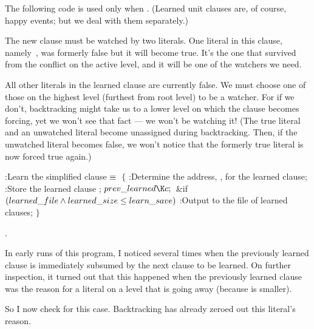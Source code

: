 The following code is used only when .
(Learned
unit clauses are, of course, happy events; but we deal with them separately.)

The new clause must be watched by two literals. One literal in this
clause, namely~, was formerly false but it will become true.
It's the one that survived from the conflict
on the active level, and it will be one of the watchers we need.

All other literals in the learned clause are currently false. We must
choose one of those on the highest level (furthest from root level)
to be a watcher. For if we don't, backtracking might take us to
a lower level on which the clause becomes forcing, yet we won't
see that fact --- we won't be watching it! (The true literal and
an unwatched literal become unassigned during backtracking.
Then, if the unwatched literal
becomes false, we won't notice that the formerly true literal
is now forced true again.)

\Y\B\4:Learn the simplified clause\X${}\equiv{}$\6
${}\{{}$\1\6
:Determine the address, , for the learned clause\X;\6
:Store the learned clause \X;\6
${}\\{prev\_learned}\K\|c;{}$\6
\&{if} ${}(\\{learned\_file}\land\\{learned\_size}\le\\{learn\_save}){}$\1\5
:Output  to the file of learned clauses\X;\2\6
\4${}\}{}$\2\par
{}.\fi

In early runs of this program, I noticed several times when the
previously
learned clause is immediately subsumed by the next clause to be learned.
On further inspection, it turned out that this happened when the
previously learned clause was the reason for a literal on a level that
is going away (because  is smaller).

So I now check for this case. Backtracking has already zeroed out this
literal's reason.

